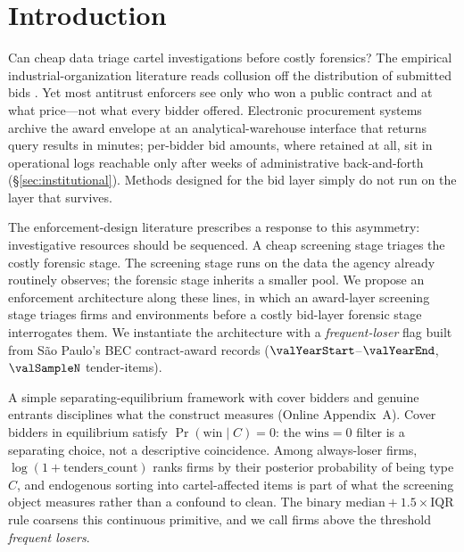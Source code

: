 \section{Introduction}
\label{sec:intro}

Can cheap data triage cartel investigations before costly
forensics? The empirical industrial-organization literature
reads collusion off the distribution of submitted bids
\citep{porter1993detection,bajari2003deciding,imhof2019detecting,wallimann2023machine,chassang2022robust}.
Yet most antitrust enforcers see only who won a public
contract and at what price---not what every bidder offered.
Electronic procurement systems archive the award envelope at
an analytical-warehouse interface that returns query results
in minutes; per-bidder bid amounts, where retained at all, sit
in operational logs reachable only after weeks of administrative
back-and-forth (\S\ref{sec:institutional}). Methods designed
for the bid layer simply do not run on the layer that
survives.

The enforcement-design literature
\citep{becker1968crime,stigler1970optimum,baker2002case,harrington2008detecting}
prescribes a response to this asymmetry: investigative
resources should be sequenced. A cheap screening stage triages
the costly forensic stage. The screening stage runs on the
data the agency already routinely observes; the forensic stage
inherits a smaller pool. We propose an enforcement architecture
along these lines, in which an award-layer screening stage
triages firms and environments before a costly bid-layer
forensic stage interrogates them. We instantiate the
architecture with a \emph{frequent-loser} flag built from
São Paulo's BEC contract-award records
($\valYearStart$--$\valYearEnd$, $\valSampleN$ tender-items).

A simple separating-equilibrium framework with cover bidders
and genuine entrants disciplines what the construct measures
(Online Appendix~A). Cover bidders in equilibrium satisfy
$\Pr(\text{win}\mid C)=0$: the $\text{wins}=0$ filter is a
separating choice, not a descriptive coincidence. Among
always-loser firms, $\log(1+\text{tenders\_count})$ ranks
firms by their posterior probability of being type $C$, and
endogenous sorting into cartel-affected items is part of what
the screening object measures rather than a confound to clean.
The binary $\text{median}+1.5\!\times\!\text{IQR}$ rule
coarsens this continuous primitive, and we call firms above
the threshold \emph{frequent losers}.

